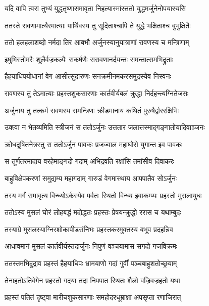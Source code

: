 \twolineshloka
{यदि वापि त्वरा तुभ्यं युद्धतृष्णासमावृता}
{निहत्यास्मांस्ततो युद्धमर्जुनेनोपयास्यसि} %

\twolineshloka
{ततस्ते रावणामात्यैरमात्याः पार्थिवस्य तु}
{सूदिताश्चापि ते युद्धे भक्षिताश्च बुभुक्षितैः} %

\twolineshloka
{ततो हलहलाशब्दो नर्मदा तिर आबभौ}
{अर्जुनस्यानुयात्राणां रावणस्य च मन्त्रिणाम्} %

\twolineshloka
{इषुभिस्तोमरैः शूलैर्वज्रकल्पैः सकर्षणैः}
{सरावणानर्दयन्तः समन्तात्समभिद्रुताः} %

\twolineshloka
{हैहयाधिपयोधानां वेग आसीत्सुदारुणः}
{सनक्रमीनमकरसमुद्रस्येव निस्वनः} %

\twolineshloka
{रावणस्य तु तेऽमात्याः प्रहस्तशुकसारणाः}
{कार्तवीर्यबलं क्रुद्धा निर्दहन्त्यग्नितेजसः} %

\twolineshloka
{अर्जुनाय तु तत्कर्म रावणस्य समन्त्रिणः}
{क्रीडमानाय कथितं पुरुषैर्द्वाररक्षिभिः} %

\twolineshloka
{उक्त्वा न भेतव्यमिति स्त्रीजनं स ततोऽर्जुनः}
{उत्ततार जलात्तस्माद्गङ्गातोयादिवाञ्जनः} %

\twolineshloka
{क्रोधदूषितनेत्रस्तु स ततोऽर्जुन पावकः}
{प्रजज्वाल महाघोरो युगान्त इव पावकः} %

\twolineshloka
{स तूर्णतरमादाय वरहेमाङ्गदो गदाम्}
{अभिद्रवति रक्षांसि तमांसीव दिवाकरः} %

\twolineshloka
{बाहुविक्षेपकरणां समुद्यम्य महागदाम्}
{गारुडं वेगमास्थाय आपपातैव सोऽर्जुनः} %

\twolineshloka
{तस्य मर्गं समावृत्य विन्ध्योऽर्कस्येव पर्वतः}
{स्थितो विन्ध्य इवाकम्प्यः प्रहस्तो मुसलायुधः} %

\twolineshloka
{ततोऽस्य मुसलं घोरं लोहबद्धं मदोद्धतः}
{प्रहस्तः प्रेषयन्क्रुद्धो ररास च यथाम्बुदः} %

\twolineshloka
{तस्याग्रे मुसलस्याग्निरशोकापीडसंनिभः}
{प्रहस्तकरमुक्तस्य बभूव प्रदहन्निव} %

\twolineshloka
{आधावमानं मुसलं कार्तवीर्यस्तदार्जुनः}
{निपुणं वञ्चयामास सगदो गजविक्रमः} %

\twolineshloka
{ततस्तमभिदुद्राव प्रहस्तं हैहयाधिपः}
{भ्रामयाणो गदां गुर्वीं पञ्चबाहुशतोच्छ्रयाम्} %

\twolineshloka
{तेनाहतोऽतिवेगेन प्रहस्तो गदया तदा}
{निपपात स्थितः शैलो वज्रिवज्रहतो यथा} %

\twolineshloka
{प्रहस्तं पतितं दृष्ट्वा मारीचशुकसारणाः}
{समहोदरधूम्राक्षा अपसृप्ता रणाजिरात्} %

